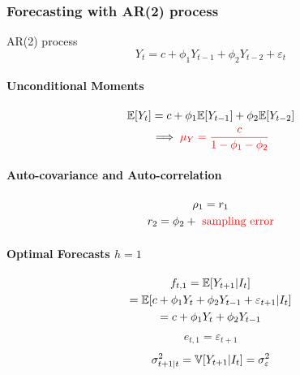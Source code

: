 \documentclass[11pt]{article}
\begin{document}
		\subsubsection{Forecasting with AR(2) process}
			\begin{definition}
				AR(2) process
				\begin{equation}
					Y_t = c + \phi_1 Y_{t-1} + \phi_2 Y_{t-2} + \varepsilon_t
				\end{equation}
			\end{definition}
			\paragraph{Unconditional Moments}
				\begin{gather}
					\mathbb{E}[{Y_t}] = c + \phi_1 \mathbb{E}[{Y_{t-1}}] + \phi_2 \mathbb{E}[{Y_{t-2}}] \\
					\implies \textcolor{red}{\mu_Y = \frac{c}{1 - \phi_1 - \phi_2}}
				\end{gather}
			\paragraph{Auto-covariance and Auto-correlation}
				\begin{gather}
					\rho_1 = r_1 \\
					r_2 = \phi_2 + \textcolor{red}{\text{ sampling error}}
				\end{gather}
			\paragraph{Optimal Forecasts $h=1$}
				\begin{gather}
					f_{t,1} = \mathbb{E}[{Y_{t+1}|I_t}] \\
					= \mathbb{E}[{c + \phi_1 Y_t + \phi_2 Y_{t-1} + \varepsilon_{t+1}|I_t}] \\
					= c + \phi_1 Y_t + \phi_2 Y_{t-1}
				\end{gather}
				\begin{gather}
					e_{t,1} = \varepsilon_{t+1}
				\end{gather}
				\begin{gather}
					\sigma_{t+1|t}^2 = \mathbb{V}[{Y_{t+1}|I_t}] = \sigma_\varepsilon^2
				\end{gather}
\end{document}
